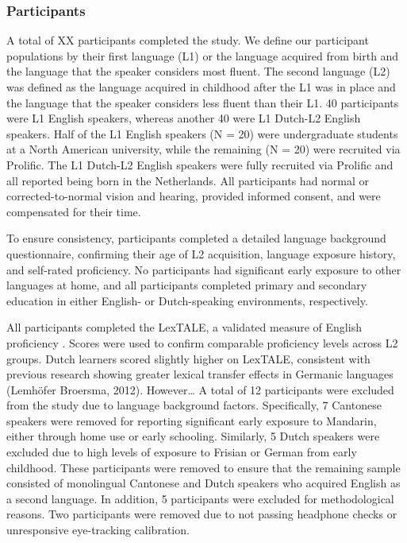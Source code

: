 \subsubsection{Participants}
A total of XX participants completed the study. We define our participant populations by their first language (L1) or the language acquired from birth and the language that the speaker considers most fluent. The second language (L2) was defined as the language acquired in childhood after the L1 was in place and the language that the speaker considers less fluent than their L1. 40 participants were L1 English speakers, whereas another 40 were L1 Dutch-L2 English speakers. Half of the L1 English speakers (N = 20) were undergraduate students at a North American university, while the remaining (N = 20) were recruited via Prolific. The L1 Dutch-L2 English speakers were fully recruited via Prolific and all reported being born in the Netherlands. All participants had normal or corrected-to-normal vision and hearing, provided informed consent, and were compensated for their time. 

To ensure consistency, participants completed a detailed language background questionnaire, confirming their age of L2 acquisition, language exposure history, and self-rated proficiency. No participants had significant early exposure to other languages at home, and all participants completed primary and secondary education in either English- or Dutch-speaking environments, respectively.

All participants completed the LexTALE, a validated measure of English proficiency \citep{lemhofer2012introducing}. Scores were used to confirm comparable proficiency levels across L2 groups. Dutch learners scored slightly higher on LexTALE, consistent with previous research showing greater lexical transfer effects in Germanic languages (Lemhöfer Broersma, 2012). However…
A total of 12 participants were excluded from the study due to language background factors. Specifically, 7 Cantonese speakers were removed for reporting significant early exposure to Mandarin, either through home use or early schooling. Similarly, 5 Dutch speakers were excluded due to high levels of exposure to Frisian or German from early childhood. These participants were removed to ensure that the remaining sample consisted of monolingual Cantonese and Dutch speakers who acquired English as a second language.
In addition, 5 participants were excluded for methodological reasons. Two participants were removed due to not passing headphone checks or unresponsive eye-tracking calibration. 

